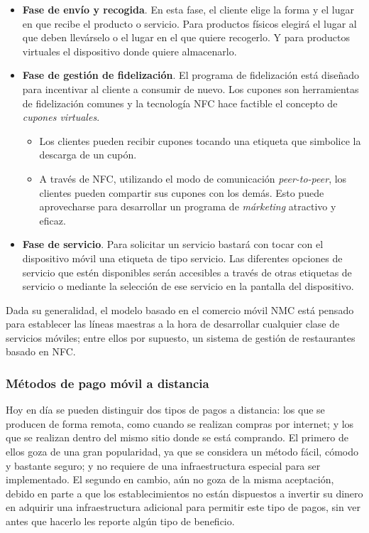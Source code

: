 \begin{itemize}
\begin{itemize}
    \end{itemize}
  \item \textbf{Fase de envío y recogida}. En esta fase, el cliente elige
  la forma y el lugar en que recibe el producto o servicio. Para productos
  físicos elegirá el lugar al que deben llevárselo o el lugar en el que quiere
  recogerlo. Y para productos virtuales el dispositivo donde quiere
  almacenarlo.
  \item \textbf{Fase de gestión de fidelización}. El programa de fidelización
  está diseñado para incentivar al cliente a consumir de nuevo. Los cupones son
  herramientas de fidelización comunes y la tecnología \acs{NFC} hace factible
  el concepto de \emph{cupones virtuales}.
    \begin{itemize}
    \item Los clientes pueden recibir cupones tocando una etiqueta que 
    simbolice la descarga de un cupón.
    \item A través de \acs{NFC}, utilizando el modo de comunicación
    \emph{peer-to-peer}, los clientes pueden compartir sus cupones con los
    demás. Esto puede aprovecharse para desarrollar un programa de
    \emph{márketing} atractivo y eficaz.
    \end{itemize}
  \item \textbf{Fase de servicio}. Para solicitar un servicio bastará con
  tocar con el dispositivo móvil una etiqueta de tipo servicio. Las diferentes
  opciones de servicio que estén disponibles serán accesibles a través de
  otras etiquetas de servicio o mediante la selección de ese servicio en la
  pantalla del dispositivo.
  \end{itemize}
  
  Dada su generalidad, el modelo basado en el comercio móvil \acs{NMC} está 
  pensado para establecer las líneas maestras a la hora de desarrollar 
  cualquier clase de servicios móviles; entre ellos por supuesto, un sistema
  de gestión de restaurantes basado en \acs{NFC}.

    \subsubsection{Métodos de pago móvil a distancia}
  Hoy en día se pueden distinguir dos tipos de pagos a distancia: los que se
  producen de forma remota, como cuando se realizan compras por internet;
  y los que se realizan dentro del mismo sitio donde se está
  comprando. El primero de ellos goza de una gran popularidad, ya que se
  considera un método fácil, cómodo y bastante seguro; y no requiere de una
  infraestructura especial para ser implementado. El segundo en cambio,
  aún no goza de la misma aceptación, debido en parte a que los 
  establecimientos no están dispuestos a invertir su dinero en adquirir una 
  infraestructura adicional para permitir este tipo de pagos, sin ver antes 
  que hacerlo les reporte algún tipo de beneficio.

